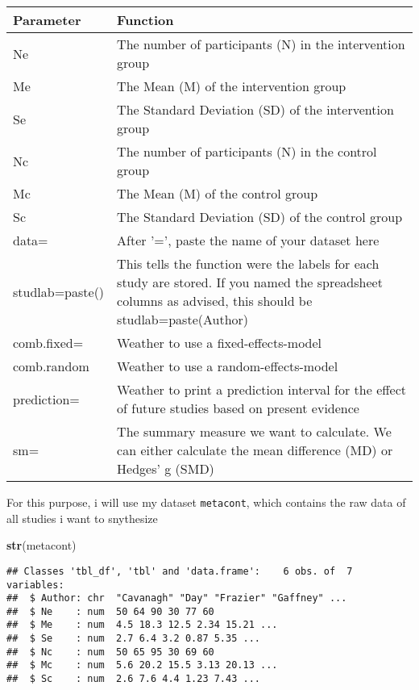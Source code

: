 \documentclass[]{book}
\newenvironment{Shaded}{\begin{snugshade}}{\end{snugshade}}
\newcommand{\KeywordTok}[1]{\textcolor[rgb]{0.13,0.29,0.53}{\textbf{#1}}}
\newcommand{\NormalTok}[1]{#1}
\theoremstyle{definition}
\theoremstyle{definition}
\theoremstyle{definition}
\theoremstyle{remark}
\begin{document}
\begin{tabular}{l|l}
\hline
Parameter & Function\\
\hline
Ne & The number of participants (N) in the intervention group\\
\hline
Me & The Mean (M) of the intervention group\\
\hline
Se & The Standard Deviation (SD) of the intervention group\\
\hline
Nc & The number of participants (N) in the control group\\
\hline
Mc & The Mean (M) of the control group\\
\hline
Sc & The Standard Deviation (SD) of the control group\\
\hline
data= & After '=', paste the name of your dataset here\\
\hline
studlab=paste() & This tells the function were the labels for each study are stored. If you named the spreadsheet columns as advised, this should be studlab=paste(Author)\\
\hline
comb.fixed= & Weather to use a fixed-effects-model\\
\hline
comb.random & Weather to use a random-effects-model\\
\hline
prediction= & Weather to print a prediction interval for the effect of future studies based on present evidence\\
\hline
sm= & The summary measure we want to calculate. We can either calculate the mean difference (MD) or Hedges' g (SMD)\\
\hline
\end{tabular}

For this purpose, i will use my dataset \texttt{metacont}, which
contains the raw data of all studies i want to snythesize

\begin{Shaded}
\begin{Highlighting}[]
\KeywordTok{str}\NormalTok{(metacont)}
\end{Highlighting}
\end{Shaded}

\begin{verbatim}
## Classes 'tbl_df', 'tbl' and 'data.frame':    6 obs. of  7 variables:
##  $ Author: chr  "Cavanagh" "Day" "Frazier" "Gaffney" ...
##  $ Ne    : num  50 64 90 30 77 60
##  $ Me    : num  4.5 18.3 12.5 2.34 15.21 ...
##  $ Se    : num  2.7 6.4 3.2 0.87 5.35 ...
##  $ Nc    : num  50 65 95 30 69 60
##  $ Mc    : num  5.6 20.2 15.5 3.13 20.13 ...
##  $ Sc    : num  2.6 7.6 4.4 1.23 7.43 ...
\end{verbatim}
\end{document}
